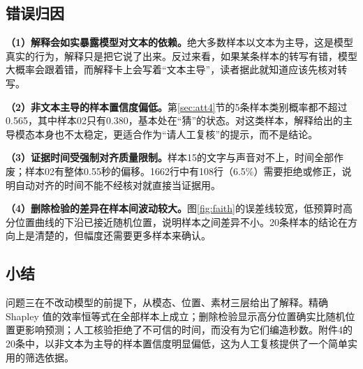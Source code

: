 \subsection{错误归因}\label{sec:q3err}

\textbf{（1）解释会如实暴露模型对文本的依赖。}绝大多数样本以文本为主导，这是模型真实的行为，解释只是把它说了出来。反过来看，如果某条样本的转写有错，模型大概率会跟着错，而解释卡上会写着“文本主导”，读者据此就知道应该先核对转写。

\textbf{（2）非文本主导的样本置信度偏低。}第\ref{sec:att4}节的5条样本类别概率都不超过0.565，其中样本02只有0.380，基本处在“猜”的状态。对这类样本，解释给出的主导模态本身也不太稳定，更适合作为“请人工复核”的提示，而不是结论。

\textbf{（3）证据时间受强制对齐质量限制。}样本15的文字与声音对不上，时间全部作废；样本02有整体0.55秒的偏移。1662行中有108行（6.5\%）需要拒绝或修正，说明自动对齐的时间不能不经核对就直接当证据用。

\textbf{（4）删除检验的差异在样本间波动较大。}图\ref{fig:faith}的误差线较宽，低预算时高分位置曲线的下沿已接近随机位置，说明样本之间差异不小。20条样本的结论在方向上是清楚的，但幅度还需要更多样本来确认。

\subsection{小结}

问题三在不改动模型的前提下，从模态、位置、素材三层给出了解释。精确 Shapley 值的效率恒等式在全部样本上成立；删除检验显示高分位置确实比随机位置更影响预测；人工核验拒绝了不可信的时间，而没有为它们编造秒数。附件4的20条中，以非文本为主导的样本置信度明显偏低，这为人工复核提供了一个简单实用的筛选依据。

